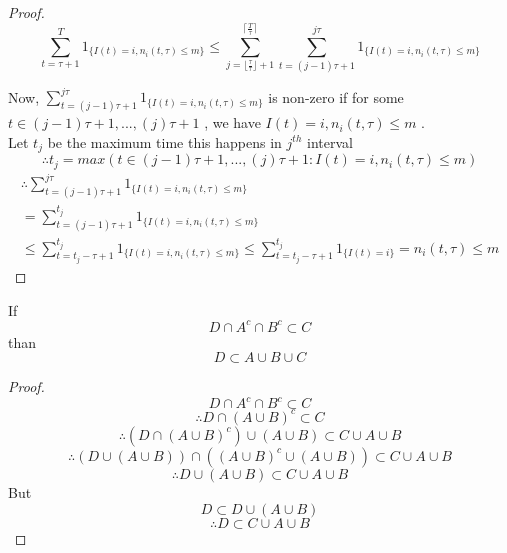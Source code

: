\documentclass[compress, serif, onlymath, professionalfonts]{beamer}
\begin{document}
\begin{frame}
\begin{tiny}




\begin{proof}
$$\sum_{t=\tau+1}^{T}1_{\{I(t)=i, n_i(t,\tau) \leq m\}} \leq \sum_{j=\lfloor{\frac{\tau}{\tau}}\rfloor+1}^{ \lceil{\frac{T}{\tau}}\rceil}\sum_{t=(j-1)\tau+1}^{j\tau}1_{\{I(t)=i, n_i(t,\tau) \leq m\}}$$ 

Now, $\sum_{t=(j-1)\tau+1}^{j\tau}1_{\{I(t)=i, n_i(t,\tau) \leq m\}}$ is non-zero if for some $t \in {(j-1)\tau+1,...,(j)\tau+1}$ , we have ${I(t)=i, n_i(t,\tau) \leq m}$ .\\ Let $t_j$ be the maximum time this happens in $j^{th}$ interval 
 $$\therefore t_j=max({t \in {(j-1)\tau+1,...,(j)\tau+1}:{I(t)=i, n_i(t,\tau) \leq m}})$$
\begin{multline*}\therefore \sum_{t=(j-1)\tau+1}^{j\tau}1_{\{I(t)=i, n_i(t,\tau) \leq m\}}\\
 = \sum_{t=(j-1)\tau+1}^{t_j}1_{\{I(t)=i,n_i(t,\tau) \leq m\}}\\
\leq \sum_{t=t_j-\tau+1}^{t_j}1_{\{I(t)=i,n_i(t,\tau) \leq m\}} \leq \sum_{t=t_j-\tau+1}^{t_j}1_{\{I(t)=i\}} = n_i(t,\tau) \leq m
\end{multline*}

\end{proof}
\end{tiny}
\end{frame}

\begin{frame}
\begin{lemma}\label{lem_1}
If $$D \cap A^c \cap B^c \subset C$$ than $$D \subset A \cup B \cup C$$
\end{lemma}
\end{frame}
\begin{frame}
\begin{footnotesize}


\begin{proof}
$$D \cap A^c \cap B^c \subset C$$ 
$$\therefore D \cap (A\cup B )^c\subset C$$ 
$$\therefore (D \cap (A\cup B )^c) \cup (A \cup B)\subset C\cup A \cup B$$ 
$$\therefore (D  \cup (A \cup B)) \cap ((A\cup B )^c \cup (A \cup B)) \subset C\cup A \cup B$$ 
$$\therefore D  \cup (A \cup B) \subset C\cup A \cup B$$ 
But
$$D \subset D  \cup (A \cup B)  $$
$$\therefore D  \subset C\cup A \cup B$$
\end{proof}
\end{footnotesize}
\end{frame}
\end{document}
